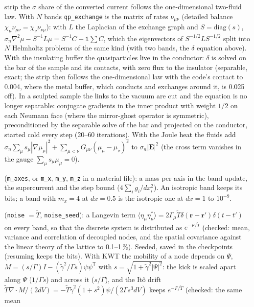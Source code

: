 \documentclass[11pt,a4paper]{article}
\newcommand{\code}[1]{\texttt{#1}}
\newcommand{\gt}{\tilde\gamma}
\begin{document}
\begin{description}
  strip the $\sigma$ share of the converted current follows the one-dimensional two-fluid law. With $N$ bands
  \code{qp\_exchange} is the matrix of rates $\nu_{\mu\nu}$ (detailed balance $\chi_\mu\nu_{\mu\nu} = \chi_\nu\nu_{\nu\mu}$): with
  $L$ the Laplacian of the exchange graph and $S = \mathrm{diag}(s)$, $\sigma_n\nabla^2\mu - S^{-1}L\mu = S^{-1}C - \mathbb 1\sum C$,
  which the eigenvectors of $S^{-1/2}LS^{-1/2}$ split into $N$ Helmholtz problems of the same kind (with two bands, the $\delta$
  equation above). With the insulating buffer the quasiparticles live in the conductor: $\delta$ is solved on the bar of the
  sample and its contacts, with zero flux to the insulator (separable, exact; the strip then follows the one-dimensional law with
  the code's contact to 0.004, where the metal buffer, which conducts and exchanges around it, is 0.025 off). In a sculpted sample
  the links to the vacuum are cut and the equation is no longer separable: conjugate gradients in the inner product with weight
  $1/2$ on each Neumann face (where the mirror-ghost operator is symmetric), preconditioned by the separable solve of the bar and
  projected on the conductor, started cold every step (20--60 iterations). With the Joule heat the fluids add
  $\sigma_n\sum_\mu s_\mu|\nabla\mu_\mu|^2 + \sum_{\mu<\nu}G_{\mu\nu}(\mu_\mu-\mu_\nu)^2$ to $\sigma_n|\mathbf E|^2$ (the cross
  term vanishes in the gauge $\sum_\mu s_\mu\mu_\mu = 0$).
\item[Anisotropic bands] (\code{m\_axes}, or \code{m\_x}, \code{m\_y}, \code{m\_z} in a material file): a mass per
  axis in the band update, the supercurrent and the step bound ($4\sum_i g_i/dx_i^2$). An isotropic band keeps its bits;
  a band with $m_x = 4$ at $dx = 0.5$ is the isotropic one at $dx = 1$ to $10^{-9}$.
\item[Thermal noise] (\code{noise} $=\tilde T$, \code{noise\_seed}): a Langevin term
  $\langle\eta_\mu\eta_\mu^*\rangle = 2\Gamma_\mu\tilde T\delta(\mathbf r-\mathbf r')\delta(t-t')$ on every band, so that the
  discrete system is distributed as $e^{-F/\tilde T}$ (checked: mean, variance and correlation of decoupled nodes, and the
  spatial covariance against the linear theory of the lattice to 0.1--1\,\%). Seeded, saved in the checkpoints (resuming
  keeps the bits). With KWT the mobility of a node depends on $\Psi$, $M = (s/\Gamma)I - (\gt^2/\Gamma s)\psi\psi^{\mathsf T}$ with
  $s = \sqrt{1+\gt^2|\Psi|^2}$: the kick is scaled apart along $\Psi$ ($1/\Gamma s$) and across it ($s/\Gamma$), and the It\^o
  drift $\tilde T\nabla\cdot M/(2dV) = -\tilde T\gt^2(1+s^2)\psi/(2\Gamma s^3 dV)$ keeps $e^{-F/\tilde T}$ (checked: the same mean

\end{description}
\end{document}
